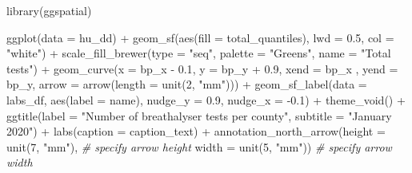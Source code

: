 \documentclass[
]{book}
\newenvironment{Shaded}{\begin{snugshade}}{\end{snugshade}}
\newcommand{\AttributeTok}[1]{\textcolor[rgb]{0.77,0.63,0.00}{#1}}
\newcommand{\CommentTok}[1]{\textcolor[rgb]{0.56,0.35,0.01}{\textit{#1}}}
\newcommand{\DecValTok}[1]{\textcolor[rgb]{0.00,0.00,0.81}{#1}}
\newcommand{\FloatTok}[1]{\textcolor[rgb]{0.00,0.00,0.81}{#1}}
\newcommand{\FunctionTok}[1]{\textcolor[rgb]{0.00,0.00,0.00}{#1}}
\newcommand{\NormalTok}[1]{#1}
\newcommand{\SpecialCharTok}[1]{\textcolor[rgb]{0.00,0.00,0.00}{#1}}
\newcommand{\StringTok}[1]{\textcolor[rgb]{0.31,0.60,0.02}{#1}}
\begin{document}
\begin{Shaded}
\begin{Highlighting}[]
\FunctionTok{library}\NormalTok{(ggspatial)}

\FunctionTok{ggplot}\NormalTok{(}\AttributeTok{data =}\NormalTok{ hu\_dd) }\SpecialCharTok{+} 
  \FunctionTok{geom\_sf}\NormalTok{(}\FunctionTok{aes}\NormalTok{(}\AttributeTok{fill =}\NormalTok{ total\_quantiles), }
          \AttributeTok{lwd =} \FloatTok{0.5}\NormalTok{, }\AttributeTok{col =} \StringTok{"white"}\NormalTok{) }\SpecialCharTok{+} 
  \FunctionTok{scale\_fill\_brewer}\NormalTok{(}\AttributeTok{type =} \StringTok{"seq"}\NormalTok{, }
                    \AttributeTok{palette =} \StringTok{"Greens"}\NormalTok{, }
                    \AttributeTok{name =} \StringTok{"Total tests"}\NormalTok{) }\SpecialCharTok{+} 
  \FunctionTok{geom\_curve}\NormalTok{(}\AttributeTok{x =}\NormalTok{ bp\_x }\SpecialCharTok{{-}} \FloatTok{0.1}\NormalTok{, }
             \AttributeTok{y =}\NormalTok{ bp\_y }\SpecialCharTok{+} \FloatTok{0.9}\NormalTok{, }
             \AttributeTok{xend =}\NormalTok{ bp\_x , }
             \AttributeTok{yend =}\NormalTok{ bp\_y, }
             \AttributeTok{arrow =} \FunctionTok{arrow}\NormalTok{(}\AttributeTok{length =} \FunctionTok{unit}\NormalTok{(}\DecValTok{2}\NormalTok{, }\StringTok{"mm"}\NormalTok{))) }\SpecialCharTok{+}
  \FunctionTok{geom\_sf\_label}\NormalTok{(}\AttributeTok{data =}\NormalTok{ labs\_df, }
                \FunctionTok{aes}\NormalTok{(}\AttributeTok{label =}\NormalTok{ name), }
                \AttributeTok{nudge\_y =} \FloatTok{0.9}\NormalTok{, }
                \AttributeTok{nudge\_x =} \SpecialCharTok{{-}}\FloatTok{0.1}\NormalTok{) }\SpecialCharTok{+} 
  \FunctionTok{theme\_void}\NormalTok{() }\SpecialCharTok{+} 
  \FunctionTok{ggtitle}\NormalTok{(}\AttributeTok{label =} \StringTok{"Number of breathalyser tests per county"}\NormalTok{, }
          \AttributeTok{subtitle =} \StringTok{"January 2020"}\NormalTok{) }\SpecialCharTok{+} 
  \FunctionTok{labs}\NormalTok{(}\AttributeTok{caption =}\NormalTok{ caption\_text) }\SpecialCharTok{+} 
  \FunctionTok{annotation\_north\_arrow}\NormalTok{(}\AttributeTok{height =} \FunctionTok{unit}\NormalTok{(}\DecValTok{7}\NormalTok{, }\StringTok{"mm"}\NormalTok{), }\CommentTok{\# specify arrow height}
                         \AttributeTok{width =} \FunctionTok{unit}\NormalTok{(}\DecValTok{5}\NormalTok{, }\StringTok{"mm"}\NormalTok{)) }\CommentTok{\# specify arrow width}
\end{Highlighting}
\end{Shaded}
\end{document}
